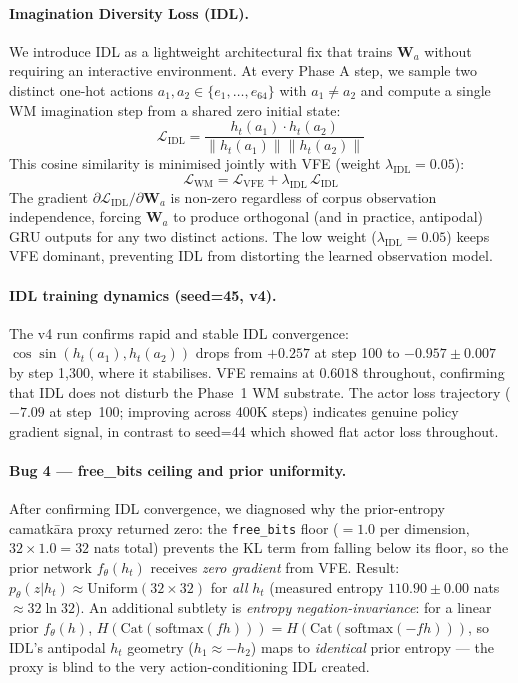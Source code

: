 \documentclass[journal,onecolumn,11pt]{IEEEtran}
\begin{document}
\paragraph{Imagination Diversity Loss (IDL).}
We introduce IDL as a lightweight architectural fix that trains $\mathbf{W}_a$
without requiring an interactive environment.
At every Phase A step, we sample two distinct one-hot actions
$a_1, a_2 \in \{e_1,\ldots,e_{64}\}$ with $a_1 \neq a_2$ and compute
a single WM imagination step from a shared zero initial state:
%
\begin{equation}
\mathcal{L}_{\text{IDL}} = \frac{h_t(a_1) \cdot h_t(a_2)}
                                {\|h_t(a_1)\| \|h_t(a_2)\|}
\end{equation}
%
This cosine similarity is minimised jointly with VFE (weight $\lambda_{\text{IDL}} = 0.05$):
%
\begin{equation}
\mathcal{L}_{\text{WM}} = \mathcal{L}_{\text{VFE}} + \lambda_{\text{IDL}}\,\mathcal{L}_{\text{IDL}}
\end{equation}
%
The gradient $\partial \mathcal{L}_{\text{IDL}} / \partial \mathbf{W}_a$ is
non-zero regardless of corpus observation independence, forcing $\mathbf{W}_a$
to produce orthogonal (and in practice, antipodal) GRU outputs for any two distinct
actions.
The low weight ($\lambda_{\text{IDL}} = 0.05$) keeps VFE dominant, preventing
IDL from distorting the learned observation model.

\paragraph{IDL training dynamics (seed=45, v4).}
The v4 run confirms rapid and stable IDL convergence:
$\cos\!\sin(h_t(a_1), h_t(a_2))$ drops from $+0.257$ at step 100 to
$-0.957 \pm 0.007$ by step 1{,}300, where it stabilises.
VFE remains at $0.6018$ throughout, confirming that IDL does not disturb the
Phase~1 WM substrate.
The actor loss trajectory ($-7.09$ at step~100; improving across 400K steps)
indicates genuine policy gradient signal, in contrast to seed=44 which showed
flat actor loss throughout.

\paragraph{Bug 4 — free\_bits ceiling and prior uniformity.}
After confirming IDL convergence, we diagnosed why the prior-entropy camatkāra proxy
returned zero: the \texttt{free\_bits} floor ($= 1.0$ per dimension,
$32{\times}1.0 = 32$ nats total) prevents the KL term from falling below its floor,
so the prior network $f_\theta(h_t)$ receives \emph{zero gradient} from VFE.
Result: $p_{\theta}(z|h_t) \approx \text{Uniform}(32{\times}32)$ for \emph{all} $h_t$
(measured entropy $110.90 \pm 0.00$ nats $\approx 32\ln 32$).
An additional subtlety is \emph{entropy negation-invariance}: for a linear prior
$f_\theta(h)$, $H(\text{Cat}(\text{softmax}(f h))) = H(\text{Cat}(\text{softmax}(-f h)))$,
so IDL's antipodal $h_t$ geometry ($h_1 \approx -h_2$) maps to \emph{identical}
prior entropy — the proxy is blind to the very action-conditioning IDL created.
\end{document}
